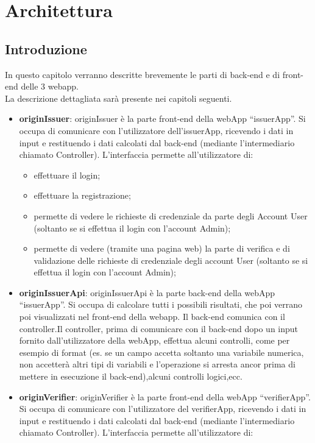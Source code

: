 \section{Architettura}

\subsection{Introduzione}
In questo capitolo verranno descritte brevemente le parti di back-end e di front-end delle 3 webapp.\\
La descrizione dettagliata sarà presente nei capitoli seguenti.\\
\begin{itemize}
    \item \textbf{originIssuer}: originIssuer è la parte front-end della webApp “issuerApp”. Si occupa di comunicare con l’utilizzatore dell’issuerApp, ricevendo i dati in input e restituendo i dati calcolati dal back-end (mediante l’intermediario chiamato Controller). L’interfaccia permette all’utilizzatore di: \begin{itemize}
        \item effettuare il login;
        \item effettuare la registrazione;
        \item permette di vedere le richieste di credenziale da parte degli Account User (soltanto se si effettua il login con l’account Admin);
        \item permette di vedere (tramite una pagina web) la parte di verifica e di validazione delle richieste di credenziale degli account User (soltanto se si effettua il login con l’account Admin);
        \end{itemize}
    \item \textbf{originIssuerApi}: originIssuerApi è la parte back-end della webApp “issuerApp”. Si occupa di calcolare tutti i possibili risultati, che poi verrano poi visualizzati nel front-end della webapp. Il back-end comunica con il controller.Il controller, prima di comunicare con il back-end dopo un input fornito dall’utilizzatore della webApp, effettua alcuni controlli, come per esempio di format (es. se un campo accetta soltanto una variabile numerica, non accetterà altri tipi di variabili e l’operazione si arresta ancor prima di mettere in esecuzione il back-end),alcuni controlli logici,ecc.
    \item \textbf{originVerifier}: originVerifier è la parte front-end della webApp “verifierApp”. Si occupa di comunicare con l’utilizzatore del verifierApp, ricevendo i dati in input e restituendo i dati calcolati dal back-end (mediante l’intermediario chiamato Controller). L’interfaccia permette all’utilizzatore di: \begin{itemize}

\end{itemize}
\end{itemize}
